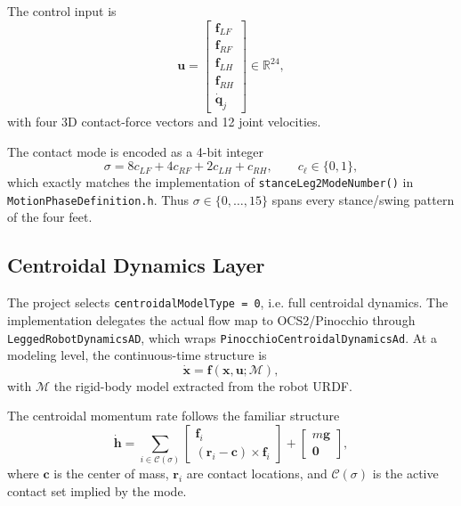 \documentclass[11pt,a4paper]{article}
\newcommand{\R}{\mathbb{R}}
\newcommand{\vect}[1]{\bm{#1}}
\newcommand{\code}[1]{\texttt{#1}}
\begin{document}
The control input is
\begin{equation}
\vect{u} =
\begin{bmatrix}
\vect{f}_{LF} \\
\vect{f}_{RF} \\
\vect{f}_{LH} \\
\vect{f}_{RH} \\
\dot{\vect{q}}_j
\end{bmatrix}
\in \R^{24},
\end{equation}
with four 3D contact-force vectors and 12 joint velocities.

The contact mode is encoded as a 4-bit integer
\begin{equation}
\sigma = 8 c_{LF} + 4 c_{RF} + 2 c_{LH} + c_{RH}, \qquad c_{\ell}\in\{0,1\},
\end{equation}
which exactly matches the implementation of \code{stanceLeg2ModeNumber()} in \code{MotionPhaseDefinition.h}. Thus $\sigma \in \{0,\dots,15\}$ spans every stance/swing pattern of the four feet.

\subsection{Centroidal Dynamics Layer}
The project selects \code{centroidalModelType = 0}, i.e. full centroidal dynamics. The implementation delegates the actual flow map to OCS2/Pinocchio through \code{LeggedRobotDynamicsAD}, which wraps \code{PinocchioCentroidalDynamicsAd}. At a modeling level, the continuous-time structure is
\begin{equation}
\dot{\vect{x}} = \vect{f}(\vect{x},\vect{u}; \mathcal{M}),
\end{equation}
with $\mathcal{M}$ the rigid-body model extracted from the robot URDF.

The centroidal momentum rate follows the familiar structure
\begin{equation}
\dot{\vect{h}} =
\sum_{i \in \mathcal{C}(\sigma)}
\begin{bmatrix}
\vect{f}_i \\
(\vect{r}_i - \vect{c}) \times \vect{f}_i
\end{bmatrix}
+
\begin{bmatrix}
m \vect{g} \\
\vect{0}
\end{bmatrix},
\end{equation}
where $\vect{c}$ is the center of mass, $\vect{r}_i$ are contact locations, and $\mathcal{C}(\sigma)$ is the active contact set implied by the mode.
\end{document}
